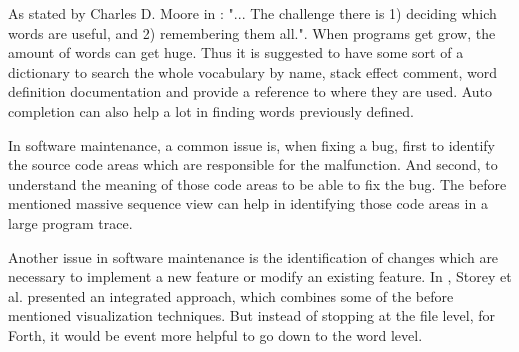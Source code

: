 As stated by \gls{Charles D. Moore} in \cite{Biancuzzi:2009:MPC:1592983}: "... The challenge there is 1) deciding which words are useful, and 2) remembering them all.". When programs get grow, the amount of words can get huge. Thus it is suggested to have some sort of a dictionary to search the whole vocabulary by name, stack effect comment, word definition documentation and provide a reference to where they are used. Auto completion can also help a lot in finding words previously defined.

In software maintenance, a common issue is, when fixing a bug, first to identify the source code areas which are responsible for the malfunction. And second, to understand the meaning of those code areas to be able to fix the bug. The before mentioned massive sequence view can help in identifying those code areas in a large program trace.

Another issue in software maintenance is the identification of changes which are necessary to implement a new feature or modify an existing feature. In \cite{Storey:1997:IVT:857188.857642}, Storey et al. presented an integrated approach, which combines some of the before mentioned visualization techniques. But instead of stopping at the file level, for Forth, it would be event more helpful to go down to the word level.

\begin{comment}
\begin{itemize}
\item keeping the mental model up to date
\item keeping artifacts up to date
\end{itemize}
\end{comment}

\begin{comment}
\begin{itemize}

\item other data structures and variables should be displayed
	\begin{itemize}
	\item memory maybe like \cite{ReissProgrammingEnvironments1995} or \cite{Aftandilian:2010:HIH:1879211.1879222} but since there is no underlying object orientation and no standardized oo system this would be hard do accomplish
	\end{itemize}

\item interactive program manipulation: state of the system before a word, after a word and by clicking on the word jumping to its definition or inserting it and there also providing those features

\item goal-oriented strategy: the definition of an execution scenario such that only the parts of interest of the software system are analyzed (Koenemann and Robertson, 1991; Zaidman,
2006).

\end{itemize}
\end{comment}